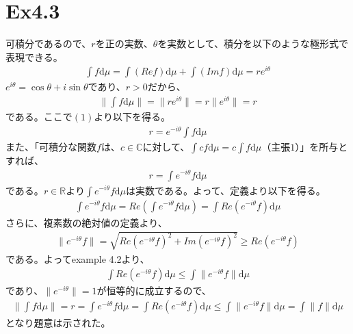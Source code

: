 \documentclass{article}
\begin{document}
\section{Ex4.3}
可積分であるので、$r$を正の実数、$\theta$を実数として、積分を以下のような極形式で表現できる。
\begin{align}
	\int f\mathrm{d}\mu = \int (Re f) \mathrm{d}\mu + \int (Im f) \mathrm{d}\mu = r e^{i\theta}
\end{align}
$e^{i\theta} = \cos \theta + i \sin\theta$であり、$r > 0$だから、
\begin{align*}
	\| \int f\mathrm{d}\mu \| = \| re^{i\theta} \| = r\| e^{i\theta} \| = r
\end{align*}
である。ここで$(1)$より以下を得る。
\begin{align*}
	r = e^{-i\theta} \int f\mathrm{d}\mu
\end{align*}
また、「可積分な関数$f$は、$c \in \mathbb{C}$に対して、$\int cf \mathrm{d}\mu = c \int f \mathrm{d}\mu$（主張$1$）」を所与とすれば、
\begin{align*}
	r = \int e^{-i\theta} f\mathrm{d}\mu
\end{align*}
である。$r\in \mathbb{R}$より$\int e^{-i\theta} f\mathrm{d}\mu$は実数である。よって、定義より以下を得る。
\begin{align*}
	\int e^{-i\theta} f\mathrm{d}\mu = Re\left( \int e^{-i\theta} f\mathrm{d}\mu \right) = \int Re\left( e^{-i\theta} f\right) \mathrm{d}\mu
\end{align*}
さらに、複素数の絶対値の定義より、
\begin{align*}
	\| e^{-i\theta} f \| = \sqrt{ Re\left( e^{-i\theta} f\right)^2 + Im\left( e^{-i\theta} f\right)^2 } \geq Re\left( e^{-i\theta} f\right)
\end{align*}
である。よってexample 4.2より、
\begin{align*}
	\int Re\left( e^{-i\theta} f\right) \mathrm{d}\mu \leq \int \| e^{-i\theta} f\| \mathrm{d}\mu
\end{align*}
であり、$\| e^{-i\theta} \| = 1$が恒等的に成立するので、
\begin{align*}
	\| \int f\mathrm{d}\mu \| = r = \int e^{-i\theta} f\mathrm{d}\mu = \int Re\left( e^{-i\theta} f\right) \mathrm{d}\mu \leq \int \| e^{-i\theta} f\| \mathrm{d}\mu = \int \| f \| \mathrm{d}\mu 
\end{align*}
となり題意は示された。
\end{document}

